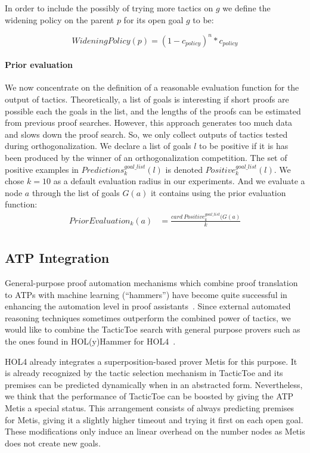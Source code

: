 \documentclass[runningheads,a4paper,draft]{svjour3}
\def\holfour{\textsf{HOL4}\xspace}
\def\holyhammer{\textsf{HOL(y)Hammer}\xspace}
\def\metis{\textsf{Metis}\xspace}
\def\tactictoe{\textsf{TacticToe}\xspace}
\begin{document}
In order to include the possibly of trying more tactics on $g$ we define the
widening policy on the parent $p$ for its open goal $g$ to be:

\[WideningPolicy(p) = (1 - c_{policy})^{n} * c_{policy}\]


\paragraph{Prior evaluation}\label{sec:evaluation}

We now concentrate on the definition of a reasonable evaluation function for the
output of tactics. Theoretically, a list of goals is interesting if short proofs
are possible each the goals in the list, and the lengths of the proofs can be
estimated from previous proof searches. However, this
approach generates too much data and slows down the proof search. So, we only
collect outputs of tactics tested during orthogonalization. We
declare a list of goals $l$ to be positive if it is has been produced by the
winner of an orthogonalization competition.
The set of positive examples in
$\mathit{Predictions}^{\mathit{goal\_list}}_k(l)$ is denoted
$\mathit{Positive}^{\mathit{goal\_list}}_k(l)$.
We chose $k=10$ as a default evaluation radius in our experiments.
And we evaluate a node $a$ through the list of goals $G(a)$ it
contains using the prior evaluation function:
\begin{align*}
\mathit{PriorEvaluation}_k (a) &=
  \frac{card\ \mathit{Positive}^{\mathit{goal\_list}}_k(G(a)}{k}\\
\end{align*}


\subsection{ATP Integration}\label{sec:atp}
General-purpose proof automation mechanisms which combine proof translation to
ATPs with machine learning (``hammers'') have become quite successful in
enhancing the automation level in proof assistants~\cite{hammers4qed}.
Since external automated reasoning techniques sometimes outperform the combined
power of tactics, we would like to combine the \tactictoe search with
general purpose provers such as the ones found in \holyhammer for
\holfour~\cite{tgck-cpp15}.

\holfour already integrates a superposition-based prover \metis for this purpose. It is already
recognized by the tactic selection mechanism in \tactictoe and its
premises can be predicted dynamically when in an abstracted form. Nevertheless,
we think that the performance of \tactictoe can be boosted by giving the ATP
\metis a special status. This arrangement consists of always predicting
premises for \metis, giving it a slightly higher timeout and
trying it first on each open goal. These modifications only induce an
linear overhead on the number nodes as \metis does not create
new goals.
\end{document}
